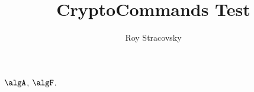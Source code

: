 \documentclass[11pt, oneside]{article}
\title{CryptoCommands Test}
\author{Roy Stracovsky}
\begin{document}
\maketitle

$\algA$, $\algF$.
\end{document}
